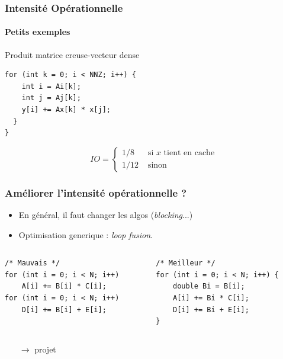 \documentclass[xcolor={x11names,svgnames}]{beamer}
\begin{document}

\begin{frame}[fragile]
  \frametitle{Intensité Opérationnelle}
  \framesubtitle{Petits exemples}
  
  \begin{block}{Produit matrice creuse-vecteur dense}
\begin{verbatim}
for (int k = 0; i < NNZ; i++) {
    int i = Ai[k];
    int j = Aj[k];
    y[i] += Ax[k] * x[j];
  }
}
\end{verbatim}
  \end{block}

  \pause

  \[
    IO = \begin{cases}
      1 / 8  & \text{ si $x$ tient en cache} \\
      1 / 12 & \text{ sinon}
    \end{cases}
  \]  
\end{frame}


\begin{frame}[fragile]
  \frametitle{Améliorer l'intensité opérationnelle ?}

  \begin{itemize}
  \item En général, il faut changer les algos (\emph{blocking}...)
  \item Optimisation generique : \emph{loop fusion}.
  \end{itemize}

  \bigskip
  
  \begin{columns}[T]
    \begin{column}{0.5\textwidth}
\begin{verbatim}
/* Mauvais */
for (int i = 0; i < N; i++)
    A[i] += B[i] * C[i];
for (int i = 0; i < N; i++)
    D[i] += B[i] + E[i];
\end{verbatim}
    \end{column}
    \begin{column}{0.5\textwidth}
\begin{verbatim}
/* Meilleur */
for (int i = 0; i < N; i++) {
    double Bi = B[i];
    A[i] += Bi * C[i];
    D[i] += Bi + E[i];
}
\end{verbatim}
    \end{column}
  \end{columns}

  \begin{itemize}
  \item[$\rightarrow$] projet 
  \end{itemize}
\end{frame}
\end{document}
